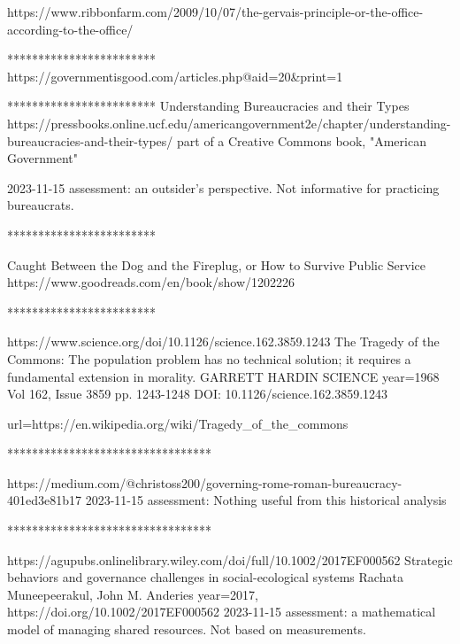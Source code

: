 
https://www.ribbonfarm.com/2009/10/07/the-gervais-principle-or-the-office-according-to-the-office/

************************
https://governmentisgood.com/articles.php@aid=20&print=1

************************
Understanding Bureaucracies and their Types
https://pressbooks.online.ucf.edu/americangovernment2e/chapter/understanding-bureaucracies-and-their-types/
part of a Creative Commons book, "American Government"

2023-11-15 assessment: an outsider's perspective. Not informative for practicing bureaucrats. 

************************

Caught Between the Dog and the Fireplug, or How to Survive Public Service
https://www.goodreads.com/en/book/show/1202226

************************

https://www.science.org/doi/10.1126/science.162.3859.1243
The Tragedy of the Commons: The population problem has no technical solution; it requires a fundamental extension in morality.
GARRETT HARDIN
SCIENCE
year={1968}
Vol 162, Issue 3859
pp. 1243-1248
DOI: 10.1126/science.162.3859.1243

url={https://en.wikipedia.org/wiki/Tragedy_of_the_commons}

*********************************

https://medium.com/@christoss200/governing-rome-roman-bureaucracy-401ed3e81b17
2023-11-15 assessment: Nothing useful from this historical analysis

*********************************

https://agupubs.onlinelibrary.wiley.com/doi/full/10.1002/2017EF000562
Strategic behaviors and governance challenges in social-ecological systems
Rachata Muneepeerakul, John M. Anderies
year={2017},
https://doi.org/10.1002/2017EF000562
2023-11-15 assessment: a mathematical model of managing shared resources. Not based on measurements. 